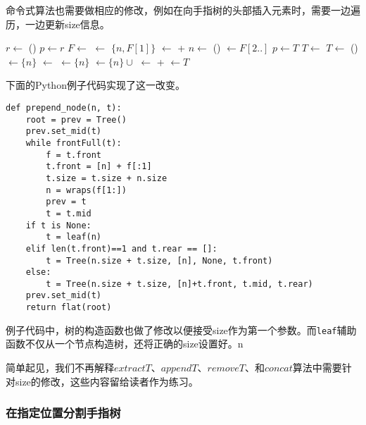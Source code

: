 \documentclass[UTF8]{article}
\begin{document}
命令式算法也需要做相应的修改，例如在向手指树的头部插入元素时，需要一边遍历，一边更新size信息。

\begin{algorithmic}
  \State $r \gets $ ()
  \State $p \gets r$
  \State {}
    \State $F \gets $ 
    \State {} $\gets$ $\{n, F[1]\}$
    \State {} $\gets$  +  
    \State $n \gets$ ()
    \State {} $\gets F[2..]$
    \State $p \gets T$
    \State $T \gets$ 
  \EndWhile
    \State $T \gets$ ()
    \State {}$\gets \{ n \}$
    \State {} $\gets$ 
    \State {} $\gets \{ n \}$
  \Else
    \State {} $\gets \{ n \} \cup $ 
  \EndIf
  \State {} $\gets$  +  
  \State {} $\gets T$
  \State \Return {}
\EndFunction
\end{algorithmic}

下面的Python例子代码实现了这一改变。

\lstset{language=Python}
\begin{lstlisting}
def prepend_node(n, t):
    root = prev = Tree()
    prev.set_mid(t)
    while frontFull(t):
        f = t.front
        t.front = [n] + f[:1]
        t.size = t.size + n.size
        n = wraps(f[1:])
        prev = t
        t = t.mid
    if t is None:
        t = leaf(n)
    elif len(t.front)==1 and t.rear == []:
        t = Tree(n.size + t.size, [n], None, t.front)
    else:
        t = Tree(n.size + t.size, [n]+t.front, t.mid, t.rear)
    prev.set_mid(t)
    return flat(root)
\end{lstlisting}

例子代码中，树的构造函数也做了修改以便接受size作为第一个参数。而\texttt{leaf}辅助函数不仅从一个节点构造树，还将正确的size设置好。n

简单起见，我们不再解释$extractT$、$appendT$、$removeT$、和$concat$算法中需要针对size的修改，这些内容留给读者作为练习。

\subsubsection{在指定位置分割手指树}
\end{document}
